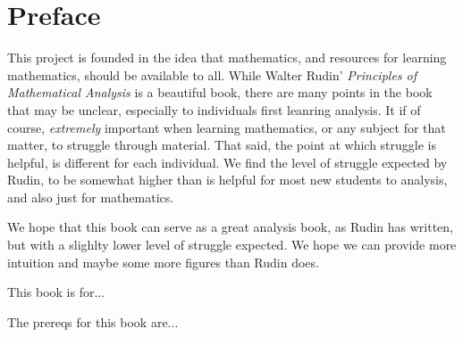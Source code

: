 \documentclass[../../templates/chapter]{subfiles}
\begin{document}
\chapter*{Preface}\label{chap:00-preface}

This project is founded in the idea that mathematics, and resources for
learning mathematics, should be available to all. While Walter Rudin'
\emph{Principles of Mathematical Analysis}\cite{rudin} is a beautiful book, there are many
points in the book that may be unclear, especially to individuals first
leanring analysis. It if of course, \emph{extremely} important when learning
mathematics, or any subject for that matter, to struggle through material. That
said, the point at which struggle is helpful, is different for each individual.
We find the level of struggle expected by Rudin, to be somewhat higher than is
helpful for most new students to analysis, and also just for mathematics.

We hope that this book can serve as a great analysis book, as Rudin has
written, but with a slighlty lower level of struggle expected. We hope we can
provide more intuition and maybe some more figures than Rudin does.

This book is for...

The prereqs for this book are...
\end{document}
